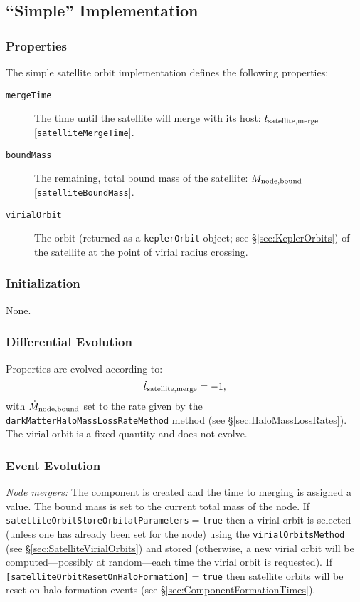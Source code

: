 \subsection{``Simple'' Implementation}\label{sec:SatelliteOrbitComponentSimple}

\subsubsection{Properties}

The simple satellite orbit implementation defines the following properties:
\begin{description}
 \item [{\tt mergeTime}] The time until the satellite will merge with its host: $t_{\rm satellite, merge}$ [{\tt satelliteMergeTime}].
 \item [{\tt boundMass}] The remaining, total bound mass of the satellite: $M_{\rm node,bound}$ [{\tt satelliteBoundMass}].
 \item[{\tt virialOrbit}] The orbit (returned as a {\tt keplerOrbit} object; see \S\ref{sec:KeplerOrbits}) of the satellite at the point of virial radius crossing.
\end{description}

\subsubsection{Initialization}

None.

\subsubsection{Differential Evolution}

Properties are evolved according to:
\begin{equation}
 \dot{t}_{\rm satellite, merge} = -1,
\end{equation}
with $\dot{M}_{\rm node,bound}$ set to the rate given by the {\tt darkMatterHaloMassLossRateMethod} method (see \S\ref{sec:HaloMassLossRates}). The virial orbit is a fixed quantity and does not evolve.

\subsubsection{Event Evolution}

\noindent\emph{Node mergers:} The \gls{component} is created and the time to merging is assigned a value. The bound mass is set to the current total mass of the node. If {\tt satelliteOrbitStoreOrbitalParameters}$=${\tt true} then a virial orbit is selected (unless one has already been set for the node) using the {\tt virialOrbitsMethod} (see \S\ref{sec:SatelliteVirialOrbits}) and stored (otherwise, a new virial orbit will be computed---possibly at random---each time the virial orbit is requested). If {\tt [satelliteOrbitResetOnHaloFormation]}$=${\tt true} then satellite orbits will be reset on halo formation events (see \S\ref{sec:ComponentFormationTimes}).\\

